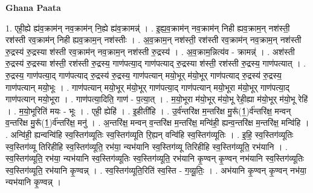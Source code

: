\documentclass[17pt]{extarticle}
\begin{document}
\textbf{Ghana Paata } \newline

1. एही॒ह्ये ह्य॑व॒क्राम॑न् नव॒क्राम॑न् नि॒ह्ये ह्य॑व॒क्रामन्न्॑ । . इ॒ह्य॒व॒क्राम॑न् नव॒क्राम॑न् निही ह्यव॒क्राम॒न् नश॑स्ती॒ रश॑स्ती रव॒क्राम॑न् निही ह्यव॒क्राम॒न् नश॑स्तीः । . अ॒व॒क्राम॒न् नश॑स्ती॒ रश॑स्ती रव॒क्राम॑न् नव॒क्राम॒न् नश॑स्ती रु॒द्रस्य॑ रु॒द्रस्या श॑स्ती रव॒क्राम॑न् नव॒क्राम॒न् नश॑स्ती रु॒द्रस्य॑ । . अ॒व॒क्राम॒न्नित्य॑व - क्रामन्न्॑ । . अश॑स्ती रु॒द्रस्य॑ रु॒द्रस्या श॑स्ती॒ रश॑स्ती रु॒द्रस्य॒ गाण॑पत्या॒द् गाण॑पत्याद् रु॒द्रस्या श॑स्ती॒ रश॑स्ती रु॒द्रस्य॒ गाण॑पत्यात् । . रु॒द्रस्य॒ गाण॑पत्या॒द् गाण॑पत्याद् रु॒द्रस्य॑ रु॒द्रस्य॒ गाण॑पत्यान् मयो॒भूर् म॑यो॒भूर् गाण॑पत्याद् रु॒द्रस्य॑ रु॒द्रस्य॒ गाण॑पत्यान् मयो॒भूः । . गाण॑पत्यान् मयो॒भूर् म॑यो॒भूर् गाण॑पत्या॒द् गाण॑पत्यान् मयो॒भूरा म॑यो॒भूर् गाण॑पत्या॒द् गाण॑पत्यान् मयो॒भूरा । . गाण॑पत्या॒दिति॒ गाण॑ - प॒त्या॒त् । . म॒यो॒भूरा म॑यो॒भूर् म॑यो॒भू रेही॒ह्या म॑यो॒भूर् म॑यो॒भू रेहि॑ । . म॒यो॒भूरिति॑ मयः - भूः । . एही॒ ह्येहि॑ । . इ॒हीती॑हि । . उ॒र्व॑न्तरि॑क्ष म॒न्तरि॑क्ष मु॒रू᳚(1॒)र्व॑न्तरि॑क्ष॒ मन्वन् व॒न्तरि॑क्ष मु॒रू᳚(1॒)र्व॑न्तरि॑क्ष॒ मनु॑ । . अ॒न्तरि॑क्ष॒ मन्वन् व॒न्तरि॑क्ष म॒न्तरि॑क्ष॒ मन्वि॑ही॒ ह्यन्व॒न्तरि॑क्ष म॒न्तरि॑क्ष॒ मन्वि॑हि । . अन्वि॑ही॒ ह्यन्वन्वि॑हि स्व॒स्तिग॑व्यूतिः स्व॒स्तिग॑व्यूति रि॒ह्यन् वन्वि॑हि स्व॒स्तिग॑व्यूतिः । . इ॒हि॒ स्व॒स्तिग॑व्यूतिः स्व॒स्तिग॑व्यू तिरिहीहि स्व॒स्तिग॑व्यूति॒ रभ॑या॒ न्यभ॑यानि स्व॒स्तिग॑व्यू तिरिहीहि स्व॒स्तिग॑व्यूति॒ रभ॑यानि । . स्व॒स्तिग॑व्यूति॒ रभ॑या॒ न्यभ॑यानि स्व॒स्तिग॑व्यूतिः स्व॒स्तिग॑व्यूति॒ रभ॑यानि कृ॒ण्वन् कृ॒ण्वन् नभ॑यानि स्व॒स्तिग॑व्यूतिः स्व॒स्तिग॑व्यूति॒ रभ॑यानि कृ॒ण्वन्न् । . स्व॒स्तिग॑व्यूति॒रिति॑ स्व॒स्ति - ग॒व्यू॒तिः॒ । . अभ॑यानि कृ॒ण्वन् कृ॒ण्वन् नभ॑या॒ न्यभ॑यानि कृ॒ण्वन्न् । \newline
\end{document}
